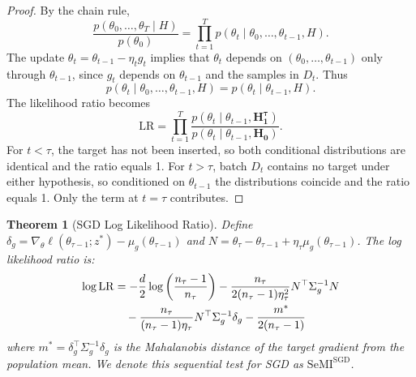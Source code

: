 \documentclass{article}
\theoremstyle{plain}
\newtheorem{theorem}{Theorem}[section]
\theoremstyle{definition}
\theoremstyle{remark}
\newcommand{\SeMISGD}{\mathrm{SeMI}^{\mathrm{SGD}}}
\begin{document}
\begin{proof}
    By the chain rule,
    \begin{equation*}
        \frac{p(\theta_0, \ldots, \theta_T \mid H)}{p(\theta_0)} = \prod_{t=1}^T p(\theta_t \mid \theta_0, \ldots, \theta_{t-1}, H).
    \end{equation*}
    The update $\theta_t = \theta_{t-1} - \eta_t g_t$ implies that $\theta_t$ depends on $(\theta_0, \ldots, \theta_{t-1})$ only through $\theta_{t-1}$, since $g_t$ depends on $\theta_{t-1}$ and the samples in $D_t$. Thus
    \begin{equation*}
        p(\theta_t \mid \theta_0, \ldots, \theta_{t-1}, H) = p(\theta_t \mid \theta_{t-1}, H).
    \end{equation*}
    The likelihood ratio becomes
    \begin{equation*}
        \mathrm{LR} = \prod_{t=1}^T \frac{p(\theta_t \mid \theta_{t-1}, \mathbf{H_1^\tau})}{p(\theta_t \mid \theta_{t-1}, \mathbf{H_0})}.
    \end{equation*}
    For $t < \tau$, the target has not been inserted, so both conditional distributions are identical and the ratio equals 1. For $t > \tau$, batch $D_t$ contains no target under either hypothesis, so conditioned on $\theta_{t-1}$ the distributions coincide and the ratio equals 1. Only the term at $t = \tau$ contributes.
\end{proof}

\begin{theorem}[SGD Log Likelihood Ratio]
    \label{thm:sgd-log-lr-app}
    Define $\delta_g = \nabla_\theta \ell(\theta_{\tau-1}; z^*) - \mu_g(\theta_{\tau-1})$ and $N = \theta_\tau - \theta_{\tau-1} + \eta_\tau \mu_g(\theta_{\tau-1})$. The log likelihood ratio is:
    \begin{align*}
        \log \mathrm{LR} & = -\frac{d}{2}\log\left(\frac{n_\tau-1}{n_\tau}\right) - \frac{n_\tau}{2(n_\tau-1)\eta_\tau^2}N^\top \Sigma_g^{-1} N \notag \\
                         & \quad - \frac{n_\tau}{(n_\tau-1)\eta_\tau}N^\top \Sigma_g^{-1}\delta_g - \frac{m^*}{2(n_\tau-1)}
    \end{align*}
    where $m^* = \delta_g^\top \Sigma_g^{-1} \delta_g$ is the Mahalanobis distance of the target gradient from the population mean. We denote this sequential test for SGD as $\SeMISGD$.
\end{theorem}
\end{document}
